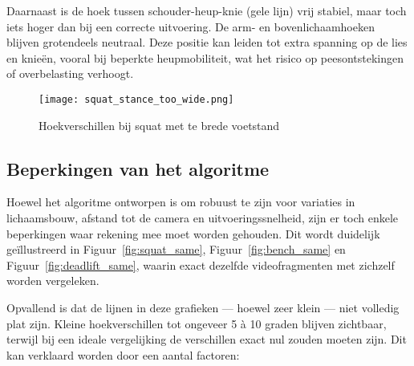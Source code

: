 Daarnaast is de hoek tussen schouder-heup-knie (gele lijn) vrij stabiel, maar toch iets hoger dan bij een correcte uitvoering. De arm- en bovenlichaamhoeken blijven grotendeels neutraal. Deze positie kan leiden tot extra spanning op de lies en knieën, vooral bij beperkte heupmobiliteit, wat het risico op peesontstekingen of overbelasting verhoogt.

\begin{figure}[h]
\centering
\texttt{[image: squat\_stance\_too\_wide.png]}
\caption{Hoekverschillen bij squat met te brede voetstand}
\label{fig:squat_stance_wide}
\end{figure}

\subsection{Beperkingen van het algoritme}

Hoewel het algoritme ontworpen is om robuust te zijn voor variaties in lichaamsbouw, afstand tot de camera en uitvoeringssnelheid, zijn er toch enkele beperkingen waar rekening mee moet worden gehouden. 
Dit wordt duidelijk geïllustreerd in Figuur~\ref{fig:squat_same}, Figuur~\ref{fig:bench_same} en Figuur~\ref{fig:deadlift_same}, waarin exact dezelfde videofragmenten met zichzelf worden vergeleken.

Opvallend is dat de lijnen in deze grafieken — hoewel zeer klein — niet volledig plat zijn. 
Kleine hoekverschillen tot ongeveer 5 à 10 graden blijven zichtbaar, terwijl bij een ideale vergelijking de verschillen exact nul zouden moeten zijn. 
Dit kan verklaard worden door een aantal factoren:

